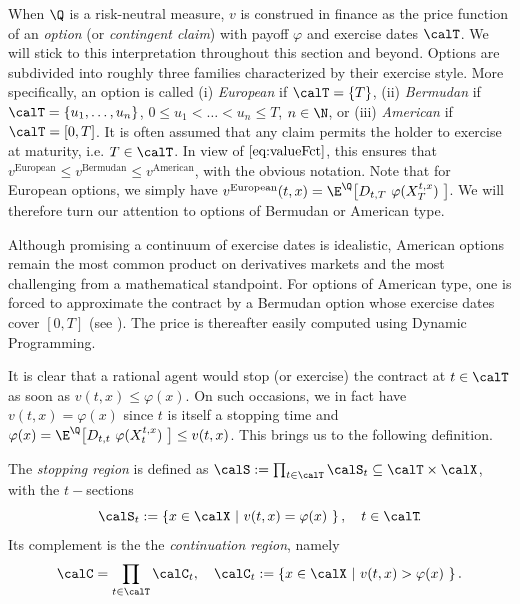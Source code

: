 When $\Q$ is a risk-neutral measure, $v$ is construed in finance as the price function of an \textit{option}  (or \textit{contingent claim}) with payoff $\varphi$ and exercise dates $\calT$. We will stick to this interpretation throughout this section and beyond.
Options are subdivided into roughly three families  characterized by their exercise style. More specifically, an option is called 
(i) \textit{European} if $\calT = \{T\}$, (ii) \textit{Bermudan} if $\calT = \{u_1,\ldots,u_n\}$, $0\le u_1 < \ldots < u_n \le T $, $n\in \N$, or (iii) \textit{American} if $\calT = [0,T]$. It is often assumed that any claim permits the holder to exercise at maturity, i.e. $T\in \calT$. In view of $\eqref{eq:valueFct}$, this ensures  that $v^{\text{European}} \le v^{\text{Bermudan}} \le v^{\text{American}} $, with the obvious notation.  Note that for European options, we simply have $v^{\text{European}}(t,x)= \E^{\Q}\! \left[ D_{t,T}\ \varphi(X^{t,x}_T)\ \right]$. We will therefore turn our attention to options of Bermudan or American type.

Although promising a continuum of exercise dates is idealistic, American options remain the most common product on derivatives markets and the most challenging from a mathematical standpoint. For options of American type, one is  forced to approximate the contract by a Bermudan option whose exercise dates cover $[0,T]$ (see \citet{Guyon}). The price is thereafter easily computed using Dynamic Programming. %

It is clear that a rational agent would stop (or exercise) the contract at  $t\in \calT$ 
as soon as $v(t,x) \le \varphi(x)$. On such occasions, we in fact have $v(t,x) = \varphi(x)$ since $t$ is itself a stopping time and $\varphi(x) = \E^{\Q}\! \left[ D_{t,t}\ \varphi(X^{t,x}_t)\ \right] \le v(t,x)$. 
This brings us to the following definition. 
\begin{definition}
The \textit{stopping region} is defined as $\calS := \prod_{t\in \calT} \calS_t \subseteq \calT \times \calX$, with  the  $t-$sections 
\begin{equation}\label{eq:stopRegion}
    \calS_t:= \left\{ x \in \calX\ | \
v(t,x)=\varphi(x)\ \right\}, \quad t\in \calT\!.
\end{equation}
Its complement 
is the 
the \textit{continuation region}, namely
$$\calC =\prod_{t\in \calT} \calC_t, \quad \calC_t:= \left\{ x \in \calX\ | \
v(t,x) > \varphi(x)\ \right\}. $$
\end{definition}

